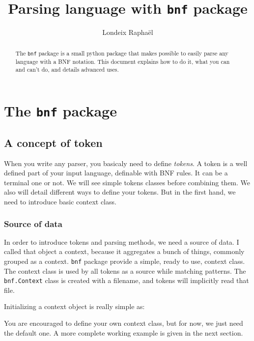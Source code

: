 \documentclass[a4paper]{article}
\title{Parsing language with \texttt{bnf} package}
\author{Londeix Raphaël}
\begin{document}
    \maketitle

    \begin{abstract}
        The \texttt{bnf} package is a small python package that
        makes possible to easily parse any language with a BNF
        notation. This document explains how to do it, what you
        can and can't do, and details advanced uses.
    \end{abstract}

    \newpage
    \section{The \texttt{bnf} package}
        \subsection{A concept of token}
            When you write any parser, you basicaly need to define
            \textit{tokens}. A token is a well defined part of your
            input language, definable with BNF rules. It can be a
            terminal one or not. We will see simple tokens classes
            before combining them. We also will detail different
            ways to define your tokens. But in the first hand,
            we need to introduce basic context class.

            \subsubsection{Source of data}
                In order to introduce tokens and parsing methods, we need
                a source of data. I called that object a context, because
                it aggregates a bunch of things, commonly grouped as a context.
                \texttt{bnf} package provide a simple, ready to use, context
                class. The context class is used by all tokens as a source
                while matching patterns. The \texttt{bnf.Context} class
                is created with a filename, and tokens will implicitly read
                that file.

                Initializing a context object is really simple as:
                

                You are encouraged to define your own context class, but for
                now, we just need the default one. A more complete working
                example is given in the next section.
\end{document}
